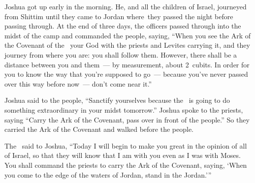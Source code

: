 
\begin{inparaenum}
   Joshua got up early in the morning. He, and all the children of Israel, journeyed from Shittim until they came to Jordan where\understood{}\ they passed the night before passing through.%
   At the end of three days, the officers passed through into the midst of the camp%
   and commanded the people, saying, ``When you see the Ark of the Covenant of the \lord\ your God with the priests and Levites carrying it, and they journey from where you are: you shall follow them.%
   However, there shall be a distance between you and them~--- by measurement, about 2~cu\-bits. In order for you to know the way that you're supposed to go~--- because you've never passed over this way before now~--- don't come near it.''%

   Joshua said to the people, ``Sanctify yourselves because the \lord\ is going to do something extraordinary in your midst tomorrow.''%
   Joshua spoke to the priests, saying ``Carry the Ark of the Covenant, pass over in front of the people.'' So they carried the Ark of the Covenant and walked before the people.%

   The \lord\ said to Joshua, ``Today I will begin to make you great in the opinion of all of Israel, so that they will know that I am with you even as I was with Moses.%
   You shall command the priests to carry the Ark of the Covenant, saying, `When you come to the edge of the waters of Jordan, stand in the Jordan.'\thinspace''%


\end{inparaenum}
